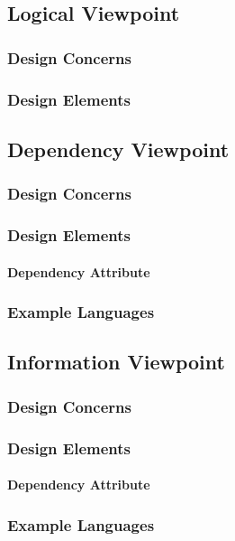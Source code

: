 \documentclass[letterpaper,10pt,titlepage,draftclsnofoot,onecolumn,onesided] {IEEEtran}
\begin{document}
\subsection{Logical Viewpoint}
\subsubsection{Design Concerns}
\subsubsection{Design Elements}

\subsection{Dependency Viewpoint}
\subsubsection{Design Concerns}
\subsubsection{Design Elements}
\paragraph{Dependency Attribute}
\subsubsection{Example Languages}

\subsection{Information Viewpoint}
\subsubsection{Design Concerns}
\subsubsection{Design Elements}
\paragraph{Dependency Attribute}
\subsubsection{Example Languages}
\end{document}
